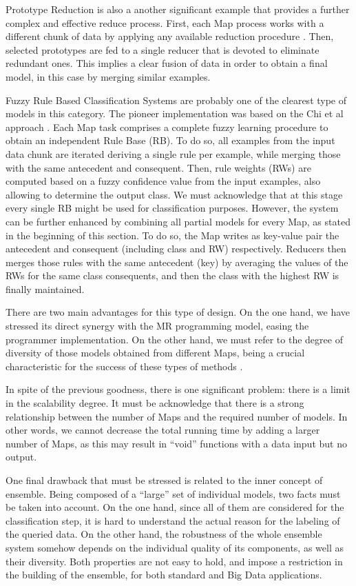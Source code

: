 \documentclass[3p,review]{elsarticle}
\begin{document}
Prototype Reduction \cite{TrigueroPBGH15-PR} is also a another significant example that provides a further complex and effective reduce process. First, each Map process works with a different chunk of data by applying any available reduction procedure \cite{TrigueroDGH12}. Then, selected prototypes are fed to a single reducer that is devoted to eliminate redundant ones. This implies a clear fusion of data in order to obtain a final model, in this case by merging similar examples. 

Fuzzy Rule Based Classification Systems \cite{Fer16_fuzzyBD} are probably one of the clearest type of models in this category. The pioneer implementation was based on the Chi et al approach \cite{RioLBH15-Fuzzy}. Each Map task comprises a complete fuzzy learning procedure to obtain an independent Rule Base (RB). To do so, all examples from the input data chunk are iterated deriving a single rule per example, while merging those with the same antecedent and consequent. Then, rule weights (RWs) are computed based on a fuzzy confidence value from the input examples, also allowing to determine the output class. We must acknowledge that at this stage every single RB might be used for classification purposes. However, the system can be further enhanced by combining all partial models for every Map, as stated in the beginning of this section. To do so, the Map writes as key-value pair the antecedent and consequent (including class and RW) respectively. Reducers then merges those rules with the same antecedent (key) by averaging the values of the RWs for the same class consequents, and then the class with the highest RW is finally maintained. 


There are two main advantages for this type of design. On the one hand, we have stressed its direct synergy with the MR programming model, easing the programmer implementation. On the other hand, we must refer to the degree of diversity of those models obtained from different Maps, being a crucial characteristic for the success of these types of methods \cite{Kuncheva05}. 

In spite of the previous goodness, there is one significant problem: there is a limit in the scalability degree. It must be acknowledge that there is a strong relationship between the number of Maps and the required number of models. In other words, we cannot decrease the total running time by adding a larger number of Maps, as this may result in ``void'' functions with a data input but no output. 

One final drawback that must be stressed is related to the inner concept of ensemble. Being composed of a ``large'' set of individual models, two facts must be taken into account. On the one hand, since all of them are considered for the classification step, it is hard to understand the actual reason for the labeling of the queried data. On the other hand, the robustness of the whole ensemble system somehow depends on the individual quality of its components, as well as their diversity. Both properties are not easy to hold, and impose a restriction in the building of the ensemble, for both standard and Big Data applications.
\end{document}
